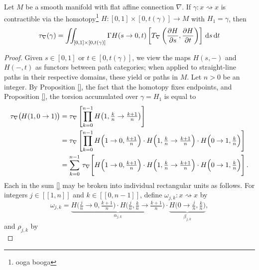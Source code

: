 \begin{theorem}
  Let $M$ be a smooth manifold with flat affine connection $\nabla$. If $\gamma \colon x \rightsquigarrow x$ is contractible via the homotopy\footnote{ooga booga} $H \colon [0, 1] \times [0, t(\gamma)] \to M$ with $H_1 = \gamma$, then 
  \begin{equation}
    \tau_\nabla (\gamma) = \iint_{[0, 1] \times [0, t(\gamma)]} \Gamma H (s \to 0, t) \left[ T_\nabla \left(\frac{\partial H}{\partial s}, \frac{\partial H}{\partial t}\right) \right] \, {\rm d} s\, {\rm d} t 
  \end{equation}
\end{theorem}
\begin{proof}
  Given $s \in [0, 1]$ or $t \in [0, t(\gamma)]$, we view the maps $H(s, -)$ and $H(-, t)$ as functors between path categories; when applied to straight-line paths in their respective domains, these yield  or  paths in $M$. Let $n > 0$ be an integer. By Proposition \ref{}, the fact that the homotopy fixes endpoints, and Proposition \ref{}, the torsion accumulated over $\gamma = H_1$ is equal to 
  \begin{align}
  \tau_\nabla \big(\hspace{-0.5pt}H(1, 0 \to 1)\hspace{-0.5pt}\big) 
  &= \tau_\nabla \left[\prod_{k = 0}^{n-1} H\big(1, \tfrac{k}{n} \to \tfrac{k + 1}{n}\big)\right] \\
  &= \tau_\nabla \left[\prod_{k = 0}^{n-1} H\Big(1 \to 0, \tfrac{k+1}{n}\Big) \cdot  H\Big(1, \tfrac{k}{n} \to \tfrac{k + 1}{n}\Big) \cdot H\Big(0 \to 1, \tfrac{k}{n}\Big)\right] \\
  &= \sum_{k=0}^{n- 1} \,\tau_\nabla \! \left[\vphantom{\prod^{n-1}}H\Big(1 \to 0, \tfrac{k+1}{n}\Big) \cdot  H\Big(1, \tfrac{k}{n} \to \tfrac{k + 1}{n}\Big) \cdot H\Big(0 \to 1, \tfrac{k}{n}\Big)\right].
  \end{align}
  Each  in the sum \ref{} may be broken into individual rectangular units as follows. For integers $j \in [\![1, n]\!]$ and $k \in [\![0, n - 1]\!]$, define  $ \omega_{j, k} \colon x \rightsquigarrow x$ by
  \begin{equation}
   \omega_{j, k} = \underbrace{H\Big(\tfrac{j}{n} \to 0, \tfrac{k+1}{n}\Big) \cdot  H\Big(\tfrac{j}{n}, \tfrac{k}{n} \to \tfrac{k + 1}{n}\Big)}_{\alpha_{j, k}} \cdot \underbrace{H\Big(0 \to \tfrac{j}{n}, \tfrac{k}{n}\Big)}_{\beta_{j, k}},
  \end{equation}
  and  $\rho_{j,k}$ by 
  \begin{equation}

\end{equation}
\end{proof}

